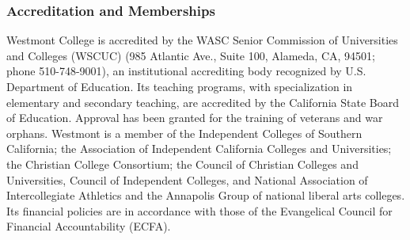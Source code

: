 \subsubsection{Accreditation and Memberships}
   Westmont College is accredited by the WASC Senior Commission of Universities and Colleges (WSCUC) (985 Atlantic Ave., Suite 100, Alameda, CA, 94501; phone 510-748-9001), an institutional accrediting body recognized by U.S. Department of Education.  Its teaching programs, with specialization in elementary and secondary teaching, are accredited by the California State Board of Education. Approval has been granted for the training of veterans and war orphans.
   Westmont is a member of the Independent Colleges of Southern California; the Association of Independent California Colleges and Universities; the Christian College Consortium; the Council of Christian Colleges and Universities, Council of Independent Colleges, and National Association of Intercollegiate Athletics and the Annapolis Group of national liberal arts colleges.  Its financial policies are in accordance with those of the Evangelical Council for Financial Accountability (ECFA).

